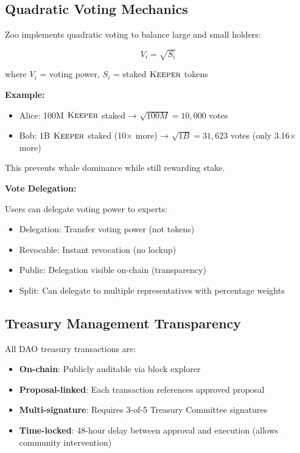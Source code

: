 \subsection{Quadratic Voting Mechanics}

Zoo implements quadratic voting to balance large and small holders:

\begin{equation}
V_i = \sqrt{S_i}
\end{equation}

where $V_i$ = voting power, $S_i$ = staked $\textsc{Keeper}$ tokens

\textbf{Example:}
\begin{itemize}
\item Alice: 100M $\textsc{Keeper}$ staked → $\sqrt{100M} = 10,000$ votes
\item Bob: 1B $\textsc{Keeper}$ staked (10× more) → $\sqrt{1B} = 31,623$ votes (only 3.16× more)
\end{itemize}

This prevents whale dominance while still rewarding stake.

\textbf{Vote Delegation:}

Users can delegate voting power to experts:
\begin{itemize}
\item Delegation: Transfer voting power (not tokens)
\item Revocable: Instant revocation (no lockup)
\item Public: Delegation visible on-chain (transparency)
\item Split: Can delegate to multiple representatives with percentage weights
\end{itemize}

\subsection{Treasury Management Transparency}

All DAO treasury transactions are:
\begin{itemize}
\item \textbf{On-chain}: Publicly auditable via block explorer
\item \textbf{Proposal-linked}: Each transaction references approved proposal
\item \textbf{Multi-signature}: Requires 3-of-5 Treasury Committee signatures
\item \textbf{Time-locked}: 48-hour delay between approval and execution (allows community intervention)
\end{itemize}

